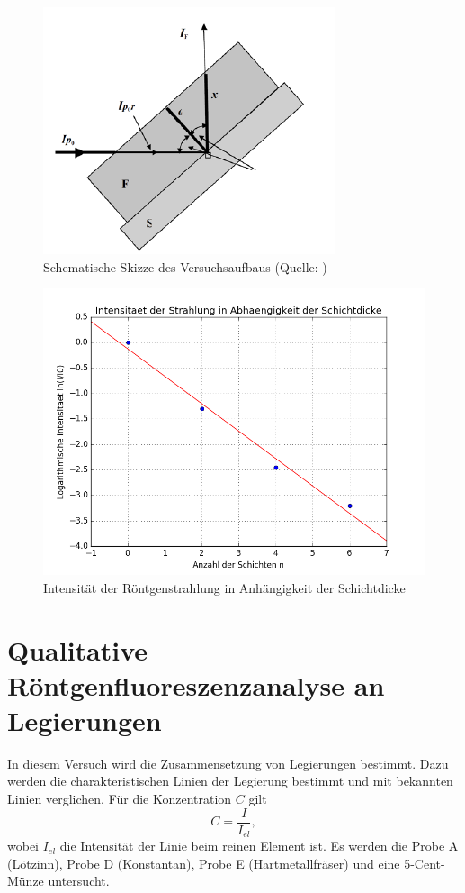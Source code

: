 \begin{figure}[tb]
 \centering
 \includegraphics[scale=0.6]{./fig/a4_bild.png}
 \caption{Schematische Skizze des Versuchsaufbaus (Quelle: \cite{litmap})}
 \label{fig:41}
\end{figure}

\begin{figure}[tb]
 \centering
 \includegraphics[scale=0.6]{./fig/a4_plot.png}
 \caption{Intensität der Röntgenstrahlung in Anhängigkeit der Schichtdicke}
 \label{fig:42}
\end{figure}

\section{Qualitative Röntgenfluoreszenzanalyse an Legierungen}

In diesem Versuch wird die Zusammensetzung von Legierungen bestimmt. Dazu werden die charakteristischen Linien der Legierung bestimmt und mit bekannten Linien verglichen. Für die Konzentration $C$ gilt
\begin{equation}
 C = \frac{I}{I_{el}},
\end{equation}
wobei $I_{el}$ die Intensität der Linie beim reinen Element ist. Es werden die Probe A (Lötzinn), Probe D (Konstantan), Probe E (Hartmetallfräser) und eine 5-Cent-Münze untersucht.

